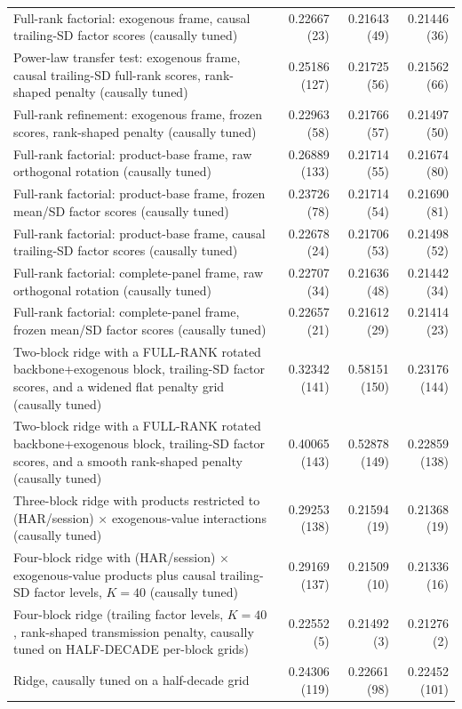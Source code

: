 \begin{longtable}{p{}rrr}
Full-rank factorial: exogenous frame, causal trailing-SD factor scores (causally tuned) & 0.22667 (23) & 0.21643 (49) & 0.21446 (36) \\
Power-law transfer test: exogenous frame, causal trailing-SD full-rank scores, rank-shaped penalty (causally tuned) & 0.25186 (127) & 0.21725 (56) & 0.21562 (66) \\
Full-rank refinement: exogenous frame, frozen scores, rank-shaped penalty (causally tuned) & 0.22963 (58) & 0.21766 (57) & 0.21497 (50) \\
Full-rank factorial: product-base frame, raw orthogonal rotation (causally tuned) & 0.26889 (133) & 0.21714 (55) & 0.21674 (80) \\
Full-rank factorial: product-base frame, frozen mean/SD factor scores (causally tuned) & 0.23726 (78) & 0.21714 (54) & 0.21690 (81) \\
Full-rank factorial: product-base frame, causal trailing-SD factor scores (causally tuned) & 0.22678 (24) & 0.21706 (53) & 0.21498 (52) \\
Full-rank factorial: complete-panel frame, raw orthogonal rotation (causally tuned) & 0.22707 (34) & 0.21636 (48) & 0.21442 (34) \\
Full-rank factorial: complete-panel frame, frozen mean/SD factor scores (causally tuned) & 0.22657 (21) & 0.21612 (29) & 0.21414 (23) \\
Two-block ridge with a FULL-RANK rotated backbone+exogenous block, trailing-SD factor scores, and a widened flat penalty grid (causally tuned) & 0.32342 (141) & 0.58151 (150) & 0.23176 (144) \\
Two-block ridge with a FULL-RANK rotated backbone+exogenous block, trailing-SD factor scores, and a smooth rank-shaped penalty (causally tuned) & 0.40065 (143) & 0.52878 (149) & 0.22859 (138) \\
Three-block ridge with products restricted to (HAR/session) $\times$ exogenous-value interactions (causally tuned) & 0.29253 (138) & 0.21594 (19) & 0.21368 (19) \\
Four-block ridge with (HAR/session) $\times$ exogenous-value products plus causal trailing-SD factor levels, $K=40$ (causally tuned) & 0.29169 (137) & 0.21509 (10) & 0.21336 (16) \\
Four-block ridge (trailing factor levels, $K=40$, rank-shaped transmission penalty, causally tuned on HALF-DECADE per-block grids) & 0.22552 (5) & 0.21492 (3) & 0.21276 (2) \\
Ridge, causally tuned on a half-decade grid & 0.24306 (119) & 0.22661 (98) & 0.22452 (101) \\

\end{longtable}
